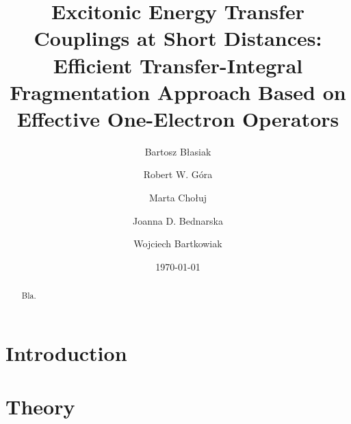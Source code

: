 


\title{Excitonic Energy Transfer Couplings at Short Distances: Efficient Transfer-Integral Fragmentation Approach
Based on Effective One-Electron Operators}

\author{Bartosz B{\l}asiak}
\author{Robert W. G{\'o}ra}
\author{Marta Cho{\l}uj} 
\author{Joanna D. Bednarska}
\author{Wojciech Bartkowiak}


\date{\today}

\begin{abstract}
Bla.
\end{abstract}

\pacs{}

\maketitle

\tableofcontents

\section{\label{s:1}Introduction}

\section{\label{s:2}Theory}

